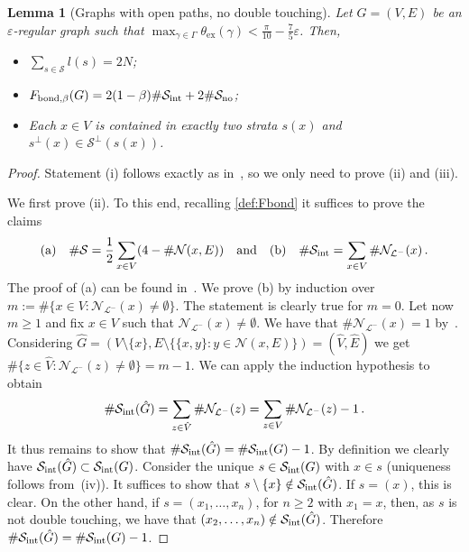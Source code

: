 \documentclass[reqno]{amsart}
\newcommand{\eps}{\varepsilon}
\theoremstyle{plain}
\newtheorem{lemma}[theorem]{Lemma}
\theoremstyle{definition}
\numberwithin{equation}{section}
\newcommand{\defas}{:=}
\begin{document}
  
\begin{lemma}[Graphs  with  open paths, no double touching]\label{lemma:opengraph}  Let $G=(V,E)$ be an $\eps$-regular graph such that $ \max_{\gamma \in \Gamma} \theta_{\mathrm{ex}}(\gamma) < \frac{\pi}{10}-  \frac{7}{5} \eps$.  Then,  
\begin{itemize}
\item[\rm (i)]  $\sum_{s \in \mathcal{S}} l(s) =2N$;
\item[\rm (ii)] $ F_{\rm bond, \beta} (G)  = 2(1-\beta) \#\mathcal{S}_{\rm int} + 2\# \mathcal{S}_{\rm no}$;
\item[\rm (iii)] Each $x\in V$ is contained in exactly two strata $s(x)$ and $s^\perp(x) \in \mathcal{S}^\perp(s(x))$. 
\end{itemize}
\end{lemma}
\begin{proof} Statement {\rm (i)} follows exactly as in~\cite[Proof of Lemma 3.3]{FriedrichKreutz}, so we only need to prove {\rm (ii)} and {\rm (iii)}. 

We first prove {\rm (ii)}. To this end, recalling \eqref{def:Fbond} it suffices to prove the claims  
\begin{align*}
{\rm (a)} \quad  \#\mathcal{S} = \frac{1}{2}\sum_{x \in V} (4-\#\mathcal{N}(x,E))  \quad \text{and} \quad {\rm (b)} \quad\#\mathcal{S}_{\rm int} = \sum_{x\in V}\#\mathcal{N}_{\mathcal{L}^-}(x)\,.
\end{align*}
The proof of {\rm (a)}  can be found in~\cite[Proof of Lemma 3.3]{FriedrichKreutz}. We  prove {\rm (b)} by induction over $ m   \defas  \#\{x \in V \colon \mathcal{N}_{\mathcal{L}^-}(x) \neq \emptyset\}$. The statement is clearly true for $m=0$. Let now $ m   \geq 1$ and fix $x \in V$ such that  $\mathcal{N}_{\mathcal{L}^-}(x) \neq \emptyset$. We have that $\#\mathcal{N}_{\mathcal{L}^-}(x)=1$ by~. Considering $\hat{G}= (V\setminus \{x\},E \setminus \{\{x,y\} \colon y \in \mathcal{N}(x,E)\})=(\hat{V},\hat{E})$   we get    $\#\{ z  \in \hat{V} \colon \mathcal{N}_{\mathcal{L}^-}(z) \neq \emptyset\} = m-1$. We  can apply the induction hypothesis  to obtain   
\begin{align*}
 \#\mathcal{S}_{\rm int}(\hat{G}) = \sum_{z \in \hat{V}} \#\mathcal{N}_{\mathcal{L}^-}(z) = \sum_{z \in V} \#\mathcal{N}_{\mathcal{L}^-}(z) -1\,.
\end{align*}
It thus remains to show that $ \#\mathcal{S}_{\rm int}(\hat{G}) =  \#\mathcal{S}_{\rm int}(G)-1$. By definition we clearly have $\mathcal{S}_{\rm int}(\hat{G}) \subset \mathcal{S}_{\rm int}({G})$. Consider the unique   $s \in \mathcal{S}_{\rm int}(G)$ with $x \in s$ (uniqueness follows from~(iv)).    It suffices to show that $s \setminus \lbrace x \rbrace \notin  \mathcal{S}_{\rm int}(\hat{G})$.    If $s=(x)$, this is clear.   On the other hand, if $s=(x_1,\ldots,x_n)$, for $n \ge 2$  with $x_1=x$, then, as $s$ is not double touching, we have that $  (x_2,\ldots,x_n) \notin \mathcal{S}_{\rm int}(\hat{G})$. Therefore $ \#\mathcal{S}_{\rm int}(\hat{G}) =  \#\mathcal{S}_{\rm int}(G)-1$.  


\end{proof}
\end{document}
